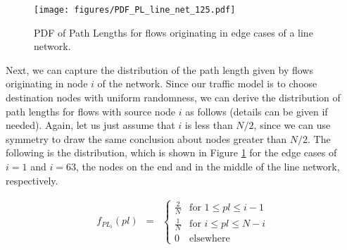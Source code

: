 \begin{figure}
\begin{centering}
    \texttt{[image: figures/PDF\_PL\_line\_net\_125.pdf]}
    \caption{PDF of Path Lengths for flows originating in edge cases of a line network.}
    \label{fig:PL_PDFs_line_net}
\end{centering}
\end{figure}

Next, we can capture the distribution of the path length given by flows originating in node $i$ of the network.  Since our traffic model is to choose destination nodes with uniform randomness, we can derive the distribution of path lengths for flows with source node $i$ as follows (details can be given if needed).  Again, let us just assume that $i$ is less than $N/2$, since we can use symmetry to draw the same conclusion about nodes greater than $N/2$.  The following is the distribution, which is shown in Figure \ref{fig:PL_PDFs_line_net} for the edge cases of $i=1$ and $i=63$, the nodes on the end and in the middle of the line network, respectively. 

\begin{eqnarray}
	f_{PL_i}(pl) &=&
		\left\{\begin{array}{ll}
		\frac{2}{N} & \mbox{for } 1 \leq pl \leq i-1 \\
		\frac{1}{N} & \mbox{for } i \leq pl \leq N-i \\
		0 &\mbox{elsewhere}
		\end{array}\right.
\label{eq:full_PDF_PL}
\end{eqnarray}

